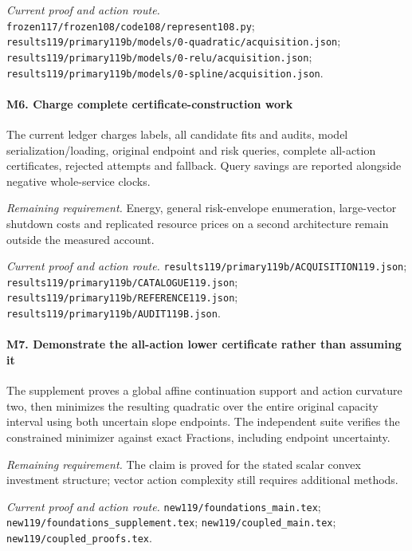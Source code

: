 \par\emph{Current proof and action route.} \nolinkurl{frozen117/frozen108/code108/represent108.py}; \nolinkurl{results119/primary119b/models/0-quadratic/acquisition.json}; \nolinkurl{results119/primary119b/models/0-relu/acquisition.json}; \nolinkurl{results119/primary119b/models/0-spline/acquisition.json}.

\paragraph{M6. Charge complete certificate-construction work}

The current ledger charges labels, all candidate fits and audits, model serialization/\allowbreak{}loading, original endpoint and risk queries, complete all-action certificates, rejected attempts and fallback. Query savings are reported alongside negative whole-service clocks.

\par\emph{Remaining requirement.} Energy, general risk-envelope enumeration, large-vector shutdown costs and replicated resource prices on a second architecture remain outside the measured account.

\par\emph{Current proof and action route.} \nolinkurl{results119/primary119b/ACQUISITION119.json}; \nolinkurl{results119/primary119b/CATALOGUE119.json}; \nolinkurl{results119/primary119b/REFERENCE119.json}; \nolinkurl{results119/primary119b/AUDIT119B.json}.

\paragraph{M7. Demonstrate the all-action lower certificate rather than assuming it}

The supplement proves a global affine continuation support and action curvature two, then minimizes the resulting quadratic over the entire original capacity interval using both uncertain slope endpoints. The independent suite verifies the constrained minimizer against exact Fractions, including endpoint uncertainty.

\par\emph{Remaining requirement.} The claim is proved for the stated scalar convex investment structure; vector action complexity still requires additional methods.

\par\emph{Current proof and action route.} \nolinkurl{new119/foundations_main.tex}; \nolinkurl{new119/foundations_supplement.tex}; \nolinkurl{new119/coupled_main.tex}; \nolinkurl{new119/coupled_proofs.tex}.

